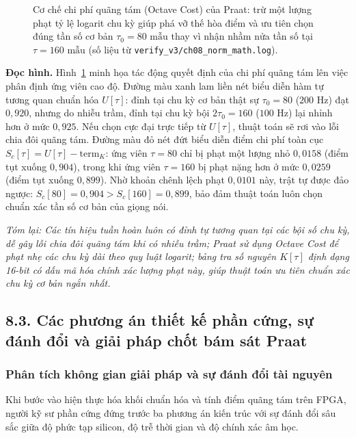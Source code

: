 \begin{figure}[htbp]
\centering
\resizebox{0.95\textwidth}{!}{}
\caption{Cơ chế chi phí quãng tám (Octave Cost) của Praat: trừ một lượng phạt tỷ lệ logarit chu kỳ giúp phá vỡ thế hòa điểm và ưu tiên chọn đúng tần số cơ bản $\tau_0 = 80\text{ mẫu}$ thay vì nhận nhầm nửa tần số tại $\tau = 160\text{ mẫu}$ (số liệu từ \texttt{verify\_v3/ch08\_norm\_math.log}).}
\label{fig:ch08_octave_cost}
\end{figure}

\textbf{Đọc hình.} Hình~\ref{fig:ch08_octave_cost} minh họa tác động quyết định của chi phí quãng tám lên việc phân định ứng viên cao độ. Đường màu xanh lam liền nét biểu diễn hàm tự tương quan chuẩn hóa $U[\tau]$: đỉnh tại chu kỳ cơ bản thật sự $\tau_0 = 80$ ($200\text{ Hz}$) đạt $0{,}920$, nhưng do nhiễu trầm, đỉnh tại chu kỳ bội $2\tau_0 = 160$ ($100\text{ Hz}$) lại nhỉnh hơn ở mức $0{,}925$. Nếu chọn cực đại trực tiếp từ $U[\tau]$, thuật toán sẽ rơi vào lỗi chia đôi quãng tám. Đường màu đỏ nét đứt biểu diễn điểm chi phí toàn cục $S_c[\tau] = U[\tau] - \text{term}_K$: ứng viên $\tau = 80$ chỉ bị phạt một lượng nhỏ $0{,}0158$ (điểm tụt xuống $0{,}904$), trong khi ứng viên $\tau = 160$ bị phạt nặng hơn ở mức $0{,}0259$ (điểm tụt xuống $0{,}899$). Nhờ khoản chênh lệch phạt $0{,}0101$ này, trật tự được đảo ngược: $S_c[80] = 0{,}904 > S_c[160] = 0{,}899$, bảo đảm thuật toán luôn chọn chuẩn xác tần số cơ bản của giọng nói.

\textit{Tóm lại: Các tín hiệu tuần hoàn luôn có đỉnh tự tương quan tại các bội số chu kỳ, dễ gây lỗi chia đôi quãng tám khi có nhiễu trầm; Praat sử dụng Octave Cost để phạt nhẹ các chu kỳ dài theo quy luật logarit; bảng tra số nguyên $K[\tau]$ định dạng 16-bit có dấu mã hóa chính xác lượng phạt này, giúp thuật toán ưu tiên chuẩn xác chu kỳ cơ bản ngắn nhất.}


\subsection*{8.3. Các phương án thiết kế phần cứng, sự đánh đổi và giải pháp chốt bám sát Praat}

\subsubsection*{Phân tích không gian giải pháp và sự đánh đổi tài nguyên}
Khi bước vào hiện thực hóa khối chuẩn hóa và tính điểm quãng tám trên FPGA, người kỹ sư phần cứng đứng trước ba phương án kiến trúc với sự đánh đổi sâu sắc giữa độ phức tạp silicon, độ trễ thời gian và độ chính xác âm học.

